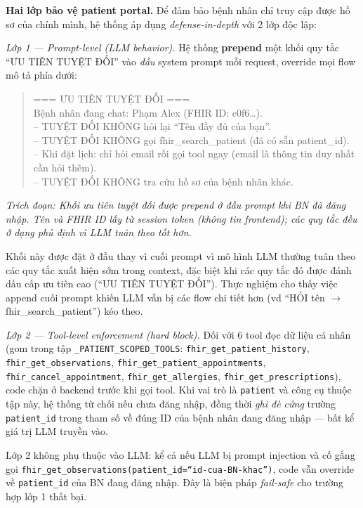 \documentclass[a4paper,13pt,3p,oneside]{report}
\theoremstyle{definition}
\theoremstyle{remark}
\theoremstyle{definition}
\begin{document}
\textbf{Hai lớp bảo vệ patient portal.} Để đảm bảo bệnh nhân chỉ truy cập được hồ sơ của chính mình, hệ thống áp dụng \textit{defense-in-depth} với 2 lớp độc lập:

\textit{Lớp 1 --- Prompt-level (LLM behavior).} Hệ thống \textbf{prepend} một khối quy tắc ``ƯU TIÊN TUYỆT ĐỐI'' vào \textit{đầu} system prompt mỗi request, override mọi flow mô tả phía dưới:

\begin{quote}
=== ƯU TIÊN TUYỆT ĐỐI ===\\
Bệnh nhân đang chat: Phạm Alex (FHIR ID: c0f6\dots).\\[3pt]
-- TUYỆT ĐỐI KHÔNG hỏi lại ``Tên đầy đủ của bạn''.\\
-- TUYỆT ĐỐI KHÔNG gọi fhir\_search\_patient (đã có sẵn patient\_id).\\
-- Khi đặt lịch: chỉ hỏi email rồi gọi tool ngay (email là thông tin duy nhất cần hỏi thêm).\\
-- TUYỆT ĐỐI KHÔNG tra cứu hồ sơ của bệnh nhân khác.
\end{quote}
\textit{Trích đoạn: Khối ưu tiên tuyệt đối được prepend ở đầu prompt khi BN đã đăng nhập. Tên và FHIR ID lấy từ session token (không tin frontend); các quy tắc đều ở dạng phủ định vì LLM tuân theo tốt hơn.}

Khối này được đặt ở đầu thay vì cuối prompt vì mô hình LLM thường tuân theo các quy tắc xuất hiện sớm trong context, đặc biệt khi các quy tắc đó được đánh dấu cấp ưu tiên cao (``ƯU TIÊN TUYỆT ĐỐI''). Thực nghiệm cho thấy việc append cuối prompt khiến LLM vẫn bị các flow chi tiết hơn (vd ``HỎI tên $\to$ fhir\_search\_patient'') kéo theo.

\textit{Lớp 2 --- Tool-level enforcement (hard block).} Đối với 6 tool đọc dữ liệu cá nhân (gom trong tập \texttt{\_PATIENT\_SCOPED\_TOOLS}: \texttt{fhir\_get\_patient\_history}, \texttt{fhir\_get\_observations}, \texttt{fhir\_get\_patient\_appointments}, \texttt{fhir\_cancel\_appointment}, \texttt{fhir\_get\_allergies}, \texttt{fhir\_get\_prescriptions}), code chặn ở backend trước khi gọi tool. Khi vai trò là \texttt{patient} và công cụ thuộc tập này, hệ thống từ chối nếu chưa đăng nhập, đồng thời \textit{ghi đè cứng} trường \texttt{patient\_id} trong tham số về đúng ID của bệnh nhân đang đăng nhập --- bất kể giá trị LLM truyền vào.

Lớp 2 không phụ thuộc vào LLM: kể cả nếu LLM bị prompt injection và cố gắng gọi \texttt{fhir\_get\_observations(patient\_id=``id-cua-BN-khac'')}, code vẫn override về \texttt{patient\_id} của BN đang đăng nhập. Đây là biện pháp \textit{fail-safe} cho trường hợp lớp 1 thất bại.
\end{document}
